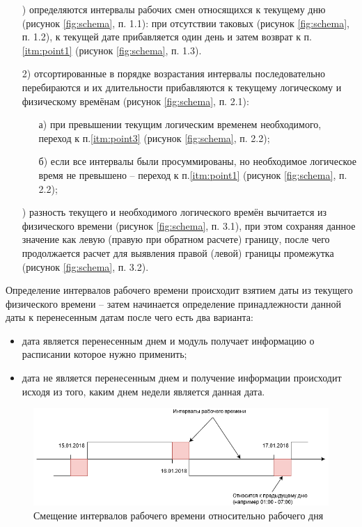 \begin{enumerate}
	\item[\mylabel{itm:point1}{1})] определяются интервалы рабочих смен относящихся к текущему дню (рисунок \ref{fig:schema}, п. 1.1): при отсутствии таковых (рисунок \ref{fig:schema}, п. 1.2), к текущей дате прибавляется один день и затем возврат к п.\ref{itm:point1} (рисунок \ref{fig:schema}, п. 1.3).
	\item[2)] отсортированные в порядке возрастания интервалы последовательно перебираются и их длительности прибавляются к текущему логическому и физическому времёнам (рисунок \ref{fig:schema}, п. 2.1):
	      \begin{enumerate}
		      \item[а)] при превышении текущим логическим временем необходимого, переход к п.\ref{itm:point3} (рисунок \ref{fig:schema}, п. 2.2);
		      \item[б)] если все интервалы были просуммированы, но необходимое логическое время не превышено -- переход к п.\ref{itm:point1} (рисунок \ref{fig:schema}, п. 2.2);
	      \end{enumerate}
	\item[\mylabel{itm:point3}{3})] разность текущего и необходимого логического времён вычитается из физического времени (рисунок \ref{fig:schema}, п. 3.1), при этом сохраняя данное значение как левую (правую при обратном расчете) границу, после чего продолжается расчет для выявления правой (левой) границы промежутка (рисунок \ref{fig:schema}, п. 3.2).
\end{enumerate}

\indent Определение интервалов рабочего времени происходит взятием даты из текущего физического времени -- затем начинается определение принадлежности данной даты к перенесенным датам после чего есть два варианта:

\begin{itemize}
	\item дата является перенесенным днем и модуль получает информацию о расписании которое нужно применить;
	\item дата не является перенесенным днем и получение информации происходит исходя из того, каким днем недели является данная дата.
\end{itemize}

\begin{figure}[h!]
	\centering
	\includegraphics[width=\linewidth]{pics/scheduleIntervals.png}
	\caption{Смещение интервалов рабочего времени относительно рабочего дня}
	\label{fig:intervals}
\end{figure}

